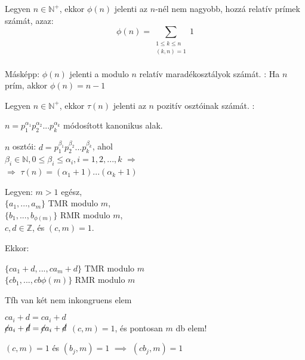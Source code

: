 \begin{frame}
  \begin{tcolorbox}[title={Def.: Az Euler-féle $\phi$ függvény}]
    Legyen $n \in \mathbb{N}^+$, ekkor ${\phi}(n)$ jelenti az $n$-nél nem nagyobb, hozzá relatív prímek számát, azaz:\\
    $${\phi}(n) = \sum_{\substack{1 \leq k \leq n \\ (k, n) = 1}} 1$$\\

    Másképp: ${\phi}(n)$ jelenti a modulo $n$ relatív maradékosztályok számát.
  \tcblower
    : Ha $n$ prím, akkor ${\phi}(n) = n - 1$
  \end{tcolorbox}

  \begin{tcolorbox}[title={Def.: A $\tau$ függvény}]
    Legyen $n \in \mathbb{N}^+$, ekkor ${\tau}(n)$ jelenti az $n$ pozitív osztóinak számát.
  \tcblower
    :\\
    \msmallskip


    $n = p_1^{{\alpha}_1}p_2^{{\alpha}_2}...p_k^{{\alpha}_k}$ módosított kanonikus alak.\\
    \msmallskip
    
    $n$ osztói: $d = p_1^{{\beta}_1}p_2^{{\beta}_2}...p_k^{{\beta}_k}$, ahol\\
    ${\beta}_i \in \mathbb{N}, 0 \leq {\beta}_i \leq {\alpha}_i, i = 1, 2, ..., k$ $\Rightarrow$\\
    $\Rightarrow$ ${\tau}(n) = ({\alpha}_1 + 1)...({\alpha}_k + 1)$
  \end{tcolorbox}
\end{frame}

\begin{frame}
  \begin{tcolorbox}[title={Tétel: Omnibusz tétel}]
    Legyen: $m > 1$ egész,\\
    $\{a_1, ..., a_m\}$ TMR modulo $m$,\\
    $\{b_1, ..., b_{{\phi}(m)}\}$ RMR modulo $m$,\\
    $c, d \in \mathbb{Z}$, és $(c,m) = 1$.\\
    \smallskip

    Ekkor:\\
    \smallskip

    $\{ ca_1 + d, ..., ca_m + d \}$ TMR modulo $m$\\
    $\{ cb_1, ..., cb{{\phi}(m)}\}$ RMR modulo $m$
  \tcblower
    \mmedskip
    
    Tfh van két nem inkongruens elem\\
    \msmallskip
    
    $ca_i + d = ca_i + d$\\
    ${\cancel{c}}a_i + {\cancel{d}} = {\cancel{c}}a_i + {\cancel{d}}$ $(c, m) = 1$, és pontosan $m$ db elem!\\
    \msmallskip
    
    $(c, m) = 1$ és $(b_j,m) = 1$ $\implies$ $(cb_j, m) = 1$
  \end{tcolorbox}
\end{frame}


